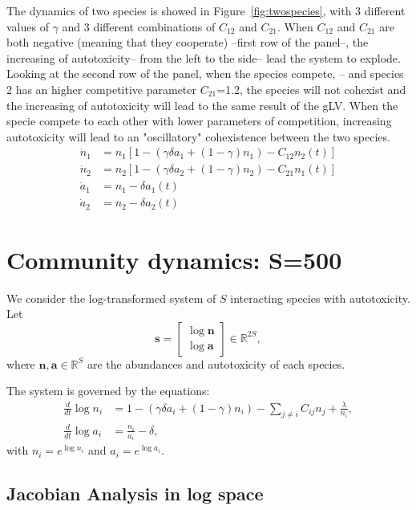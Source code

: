 \documentclass{article}
\begin{document}
The dynamics of two species is showed in Figure~\ref{fig:twospecies}, with 3 different values of $\gamma$ and 3 different combinations of $C_{12}$ and $C_{21}$.
When $C_{12}$ and $C_{21}$ are both negative (meaning that they cooperate) --first row of the panel--, the increasing of autotoxicity-- from the left to the side-- lead the system to explode. Looking at the second row of the panel, when the species compete, -- and species 2 has an higher competitive parameter $C_{21}$=1.2, the species will not cohexist and the increasing of autotoxicity will lead to the same result of the gLV. When the specie compete to each other with lower parameters of competition, increasing autotoxicity will lead to an "oscillatory" cohexistence between the two species. 
\begin{align}
\dot{n}_1 &= n_1 \left[ 1 - \left( \gamma \delta a_1 + (1 - \gamma) n_1 \right) - C_{12} n_2(t) \right] \tag{Species 1} \\
\dot{n}_2 &= n_2\left[ 1 - \left( \gamma \delta a_2 + (1 - \gamma) n_2 \right) - C_{21} n_1(t) \right] \tag{Species 2} \\
\dot{a}_1 &= n_1 - \delta a_1(t) \tag{Autotoxin 1} \\
\dot{a}_2 &= n_2 - \delta a_2(t) \tag{Autotoxin 2}
\end{align}




\clearpage

\section{Community dynamics: S=500}
We consider the log-transformed system of $S$ interacting species with autotoxicity. Let
\[
\bm{s} = 
\begin{bmatrix}
\log \bm{n} \\
\log \bm{a}
\end{bmatrix}
\in \mathbb{R}^{2S},
\]
where $\bm{n}, \bm{a} \in \mathbb{R}^S$ are the abundances and autotoxicity of each species.

The system is governed by the equations:
\begin{align*}
\frac{d}{dt} \log n_i &= 1 - \left( \gamma \delta a_i + (1 - \gamma) n_i \right) - \sum_{j \ne i} C_{ij} n_j + \frac{\lambda}{n_i}, \\
\frac{d}{dt} \log a_i &= \frac{n_i}{a_i} - \delta,
\end{align*}
with $n_i = e^{\log n_i}$ and $a_i = e^{\log a_i}$.

\subsection{Jacobian Analysis in log space}
\end{document}
